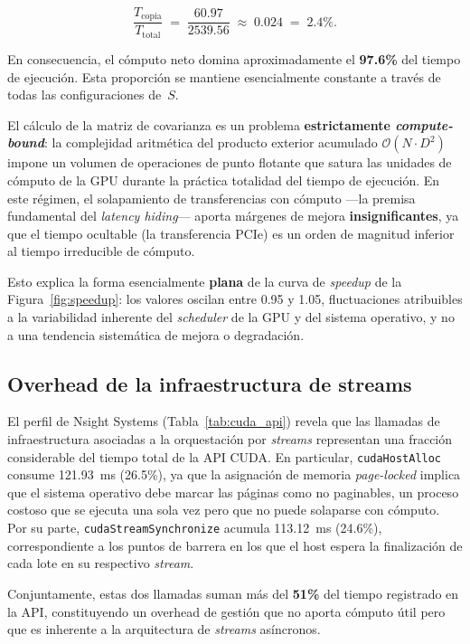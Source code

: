 \documentclass[12pt, a4paper]{article}
\begin{document}
\begin{equation}
    \frac{T_{\text{copia}}}{T_{\text{total}}} \;=\;
    \frac{60.97}{2539.56} \;\approx\; 0.024 \;=\; 2.4\%.
\end{equation}

En consecuencia, el cómputo neto domina aproximadamente el \textbf{97.6\%}
del tiempo de ejecución. Esta proporción se mantiene esencialmente constante
a través de todas las configuraciones de~$S$.

El cálculo de la matriz de covarianza es un problema \textbf{estrictamente
\textit{compute-bound}}: la complejidad aritmética del producto exterior
acumulado $\mathcal{O}(N \cdot D^2)$ impone un volumen de operaciones de punto
flotante que satura las unidades de cómputo de la GPU durante la práctica
totalidad del tiempo de ejecución. En este régimen, el solapamiento de
transferencias con cómputo ---la premisa fundamental del \textit{latency
hiding}--- aporta márgenes de mejora \textbf{insignificantes}, ya que el
tiempo ocultable (la transferencia PCIe) es un orden de magnitud inferior al
tiempo irreducible de cómputo.

Esto explica la forma esencialmente \textbf{plana} de la curva de
\textit{speedup} de la Figura~\ref{fig:speedup}: los valores oscilan entre
0.95 y 1.05, fluctuaciones atribuibles a la variabilidad inherente del
\textit{scheduler} de la GPU y del sistema operativo, y no a una tendencia
sistemática de mejora o degradación.

\subsection{Overhead de la infraestructura de streams}

El perfil de Nsight Systems (Tabla~\ref{tab:cuda_api}) revela que las
llamadas de infraestructura asociadas a la orquestación por \textit{streams}
representan una fracción considerable del tiempo total de la API CUDA.
En particular, \texttt{cudaHostAlloc} consume 121.93~ms (26.5\%), ya que la
asignación de memoria \textit{page-locked} implica que el sistema operativo
debe marcar las páginas como no paginables, un proceso costoso que se ejecuta
una sola vez pero que no puede solaparse con cómputo. Por su parte,
\texttt{cudaStreamSynchronize} acumula 113.12~ms (24.6\%), correspondiente a
los puntos de barrera en los que el host espera la finalización de cada lote
en su respectivo \textit{stream}.

Conjuntamente, estas dos llamadas suman más del \textbf{51\%} del tiempo
registrado en la API, constituyendo un overhead de gestión que no aporta
cómputo útil pero que es inherente a la arquitectura de \textit{streams}
asíncronos.
\end{document}
